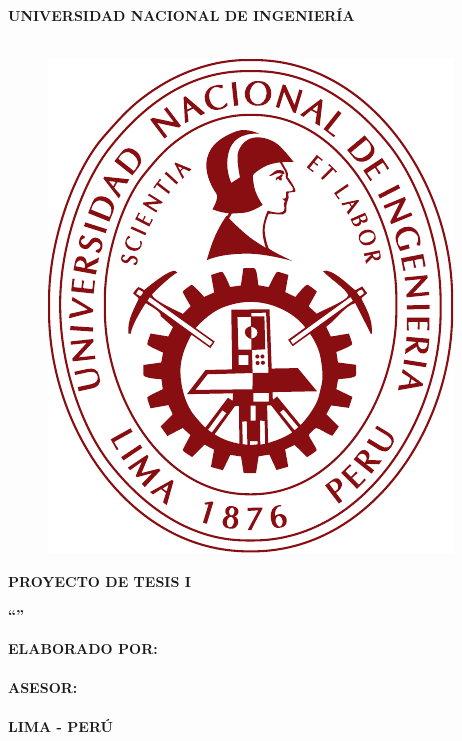 \begin{titlepage}
	\begin{center}
		\vspace*{2 mm}
		{\LARGE \textbf{UNIVERSIDAD NACIONAL DE INGENIERÍA}}\\
		\vspace{5 mm}
		{\LARGE \textbf{\@facultad}}\\
		\vspace{6.5 mm}
		\begin{figure}[h]
			\centering
			\includegraphics[scale=1]{E_IMAGENES/0_Caratula/UNI_LOGO1.pdf}
		\end{figure}
		\vspace{1 mm}
		{\Large \textbf{PROYECTO DE TESIS I} }\\
		\vspace{5 mm}

		\onehalfspacing  %
		{\Large \textbf{``{\@titlecaratula}''} }\\

		\singlespacing  %

		\vspace{5 mm}
		{\large \textbf{ELABORADO POR:} }\\
		\vspace{5 mm}
		{\large \textbf{\@authorcaratula} }\\
		\vspace{10 mm}
		{\large \textbf{ASESOR:} }\\
		\vspace{5 mm}
		{\large \textbf{\@asesor} }\\
		\vspace{10 mm}
		{\large \textbf{LIMA - PERÚ} }\\
		\vspace{5 mm}
		{\large \textbf{\@yyearr} }\\

	\end{center}
\end{titlepage}